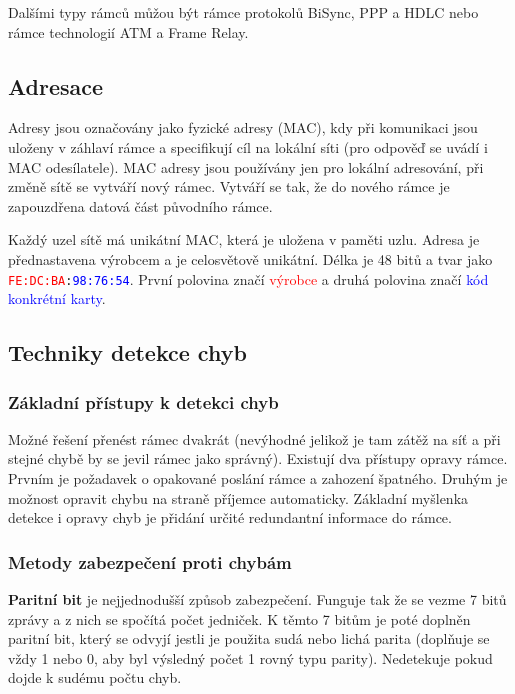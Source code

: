 Dalšími typy rámců můžou být rámce protokolů BiSync, PPP a HDLC nebo rámce technologií ATM a Frame Relay.

\subsection{Adresace}

Adresy jsou označovány jako fyzické adresy (MAC), kdy při komunikaci jsou uloženy v záhlaví rámce a specifikují cíl na lokální síti (pro odpověď se uvádí i MAC odesílatele). MAC adresy jsou používány jen pro lokální adresování, při změně sítě se vytváří nový rámec. Vytváří se tak, že do nového rámce je zapouzdřena datová část původního rámce.

Každý uzel sítě má unikátní MAC, která je uložena v paměti uzlu. Adresa je přednastavena výrobcem a je celosvětově unikátní. Délka je 48 bitů a tvar jako \texttt{\textcolor{red}{FE:DC:BA}:\textcolor{blue}{98:76:54}}. První polovina značí \textcolor{red}{výrobce} a druhá polovina značí \textcolor{blue}{kód konkrétní karty}.

\subsection{Techniky detekce chyb}

\subsubsection{Základní přístupy k detekci chyb}

Možné řešení přenést rámec dvakrát (nevýhodné jelikož je tam zátěž na síť a při stejné chybě by se jevil rámec jako správný). Existují dva přístupy opravy rámce. Prvním je požadavek o opakované poslání rámce a zahození špatného. Druhým je možnost opravit chybu na straně příjemce automaticky. Základní myšlenka detekce i opravy chyb je přidání určité redundantní informace do rámce.

\subsubsection{Metody zabezpečení proti chybám}

\textbf{Paritní bit} je nejjednodušší způsob zabezpečení. Funguje tak že se vezme 7 bitů zprávy a z nich se spočítá počet jedniček. K těmto 7 bitům je poté doplněn paritní bit, který se odvyjí jestli je použita sudá nebo lichá parita (doplňuje se vždy 1 nebo 0, aby byl výsledný počet 1 rovný typu parity). Nedetekuje pokud dojde k sudému počtu chyb.

